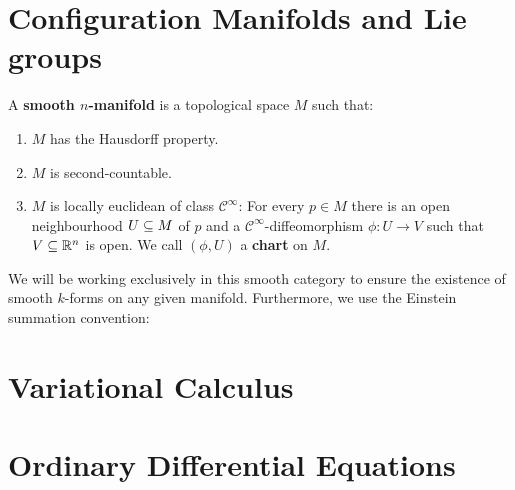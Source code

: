 \section{Configuration Manifolds and Lie groups}

\begin{definition}
    A \textbf{smooth $n$-manifold} is a topological space $M$ such that:
    \begin{enumerate}
        \item $M$ has the Hausdorff property.
        \item $M$ is second-countable.
        \item $M$ is locally euclidean of class $\mathcal{C}^\infty$: For every $p \in M$ there is an open neighbourhood $U \subseteq M$ of $p$ and a $\mathcal{C}^\infty$-diffeomorphism $\phi: U \to V$ such that $V \subseteq \mathbb{R}^n$ is open. We call $(\phi, U)$ a \textbf{chart} on $M$.
    \end{enumerate}
\end{definition}
We will be working exclusively in this smooth category to ensure the existence of smooth $k$-forms on any given manifold. Furthermore, we use the Einstein summation convention:    
\section{Variational Calculus}

\section{Ordinary Differential Equations}
